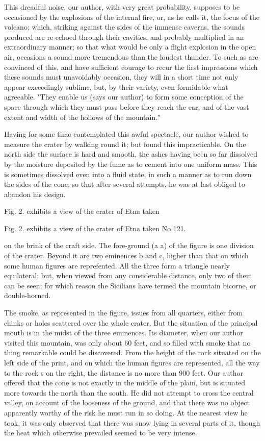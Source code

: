 \documentclass{article}
\begin{document}
This dreadful noise, our author, with very great probability, supposes to be occasioned by the explosions of the internal fire, or, as he calls it, the focus of the volcano; which, striking against the sides of the immense caverns, the sounds produced are re-echoed through their cavities, and probably multiplied in an extraordinary manner; so that what would be only a flight explosion in the open air, occasions a sound more tremendous than the loudest thunder. To such as are convinced of this, and have sufficient courage to recur the first impressions which these sounds must unavoidably occasion, they will in a short time not only appear exceedingly sublime, but, by their variety, even formidable what agreeable. "They enable us (says our author) to form some conception of the space through which they must pass before they reach the ear, and of the vast extent and width of the hollows of the mountain."

Having for some time contemplated this awful spectacle, our author wished to measure the crater by walking round it; but found this impracticable. On the north side the surface is hard and smooth, the ashes having been so far dissolved by the moisture deposited by the fume as to cement into one uniform mass. This is sometimes dissolved even into a fluid state, in such a manner as to run down the sides of the cone; so that after several attempts, he was at last obliged to abandon his design.

Fig. 2. exhibits a view of the crater of Etna taken

Fig. 2. exhibits a view of the crater of Etna taken
No 121.

on the brink of the craft side. The fore-ground (a a) of the figure is one division of the crater. Beyond it are two eminences b and c, higher than that on which some human figures are reprefented. All the three form a triangle nearly equilateral; but, when viewed from any considerable distance, only two of them can be seen; for which reason the Sicilians have termed the mountain bicorne, or double-horned.

The smoke, as represented in the figure, issues from all quarters, either from chinks or holes scattered over the whole crater. But the situation of the principal mouth is in the midst of the three eminences. Its diameter, when our author visited this mountain, was only about 60 feet, and so filled with smoke that no thing remarkable could be discovered. From the height of the rock situated on the left side of the print, and on which the human figures are represented, all the way to the rock s on the right, the distance is no more than 900 feet. Our author offered that the cone is not exactly in the middle of the plain, but is situated more towards the north than the south. He did not attempt to cross the central valley, on account of the looseness of the ground, and that there was no object apparently worthy of the risk he must run in so doing. At the nearest view he took, it was only observed that there was snow lying in several parts of it, though the heat which otherwise prevailed seemed to be very intense.
\end{document}
